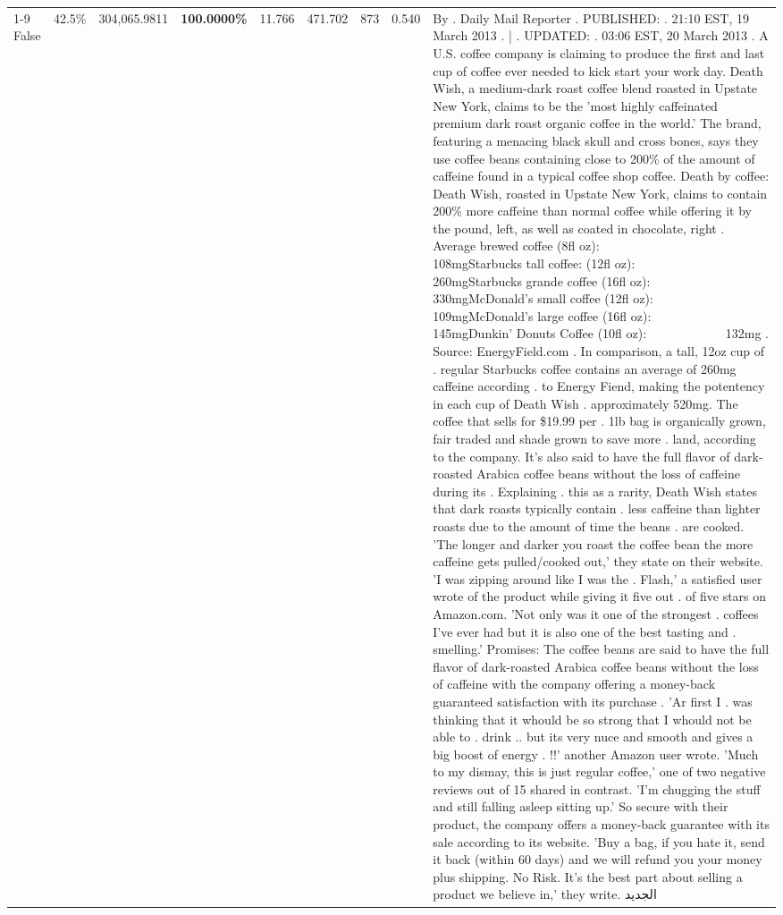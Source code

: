 \begin{table}[H]
{\begin{tabular}{lllrlllll}
\cline{1-9}
False & 42.5\% & 304,065.9811 & \bfseries \color{red} 100.0000\% & 11.766 & 471.702 & 873 & 0.540 & By . Daily Mail Reporter . PUBLISHED: . 21:10 EST, 19 March 2013 . | . UPDATED: . 03:06 EST, 20 March 2013 . A U.S. coffee company is claiming to produce the first and last cup of coffee ever needed to kick start your work day. Death Wish, a medium-dark roast coffee blend roasted in Upstate New York, claims to be the 'most highly caffeinated premium dark roast organic coffee in the world.' The brand, featuring a menacing black skull and cross bones, says they use coffee beans containing close to 200\% of the amount of caffeine found in a typical coffee shop coffee. Death by coffee: Death Wish, roasted in Upstate New York, claims to contain 200\% more caffeine than normal coffee while offering it by the pound, left, as well as coated in chocolate, right . Average brewed coffee (8fl oz):              108mgStarbucks tall coffee: (12fl oz):                260mgStarbucks grande coffee (16fl oz):         330mgMcDonald's small coffee (12fl oz):           109mgMcDonald's large coffee (16fl oz):           145mgDunkin' Donuts Coffee (10fl oz):             132mg . Source: EnergyField.com . In comparison, a tall, 12oz cup of . regular Starbucks coffee contains an average of 260mg caffeine according . to Energy Fiend, making the potentency in each cup of Death Wish . approximately 520mg. The coffee that sells for \$19.99 per . 1lb bag is organically grown, fair traded and shade grown to save more . land, according to the company. It's also said to have the full flavor of dark-roasted Arabica coffee beans without the loss of caffeine during its . Explaining . this as a rarity, Death Wish states that dark roasts typically contain . less caffeine than lighter roasts due to the amount of time the beans . are cooked. 'The longer and darker you roast the coffee bean the more caffeine gets pulled/cooked out,' they state on their website. 'I was zipping around like I was the . Flash,' a satisfied user wrote of the product while giving it five out . of five stars on Amazon.com. 'Not only was it one of the strongest . coffees I've ever had but it is also one of the best tasting and . smelling.’ Promises: The coffee beans are said to have the full flavor of dark-roasted Arabica coffee beans without the loss of caffeine with the company offering a money-back guaranteed satisfaction with its purchase . 'Ar first I . was thinking that it whould be so strong that I whould not be able to . drink .. but its very nuce and smooth and gives a big boost of energy . !!' another Amazon user wrote. 'Much to my dismay, this is just regular coffee,' one of two negative reviews out of 15 shared in contrast. 'I'm chugging the stuff and still falling asleep sitting up.' So secure with their product, the company offers a money-back guarantee with its sale according to its website. 'Buy a bag, if you hate it, send it back (within 60 days) and we will refund you your money plus shipping. No Risk. It’s the best part about selling a product we believe in,' they write. الجديد \\

\end{tabular}}
\end{table}
